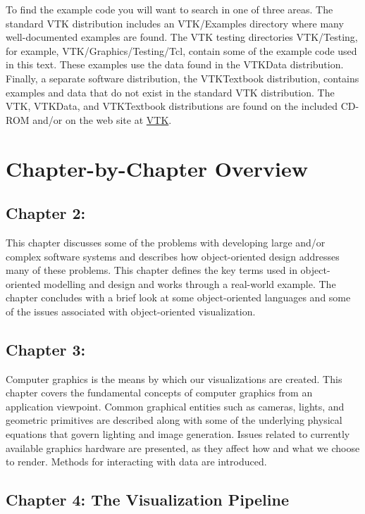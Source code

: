 To find the example code you will want to search in one of three areas. The standard VTK distribution includes an VTK/Examples directory where many well-documented examples are found. The VTK testing directories VTK/Testing, for example, VTK/Graphics/Testing/Tcl, contain some of the example code used in this text. These examples use the data found in the VTKData distribution. Finally, a separate software distribution, the VTKTextbook distribution, contains examples and data that do not exist in the standard VTK distribution. The VTK, VTKData, and VTKTextbook distributions are found on the included CD-ROM and/or on the web site at \href{https://www.vtk.org/}{VTK}.

\section{Chapter-by-Chapter Overview}

\subsection*{Chapter 2: }

This chapter discusses some of the problems with developing large and/or complex software systems and describes how object-oriented design addresses many of these problems. This chapter defines the key terms used in object-oriented modelling and design and works through a real-world example. The chapter concludes with a brief look at some object-oriented languages and some of the issues associated with object-oriented visualization.

\subsection*{Chapter 3: }

Computer graphics is the means by which our visualizations are created. This chapter covers the fundamental concepts of computer graphics from an application viewpoint. Common graphical entities such as cameras, lights, and geometric primitives are described along with some of the underlying physical equations that govern lighting and image generation. Issues related to currently available graphics hardware are presented, as they affect how and what we choose to render. Methods for interacting with data are introduced.

\subsection*{Chapter 4: The Visualization Pipeline}

